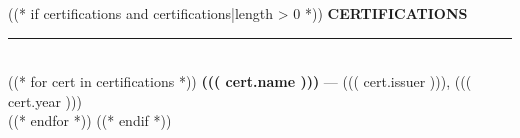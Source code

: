 \documentclass[11pt,a4paper]{article}
\begin{document}
\begin{minipage}[t]{0.60\textwidth}
\begin{minipage}[t]{0.88\textwidth}
((* if certifications and certifications|length > 0 *))
{\fontsize{11}{13}\selectfont\bfseries\color{navy}\MakeUppercase{Certifications}}\\[2pt]
{\color{gold}\rule{\linewidth}{0.4pt}}\\[6pt]
((* for cert in certifications *))
{\bfseries ((( cert.name )))} --- {\small\color{muted} ((( cert.issuer ))), ((( cert.year )))}\\[6pt]
((* endfor *))
((* endif *))

\end{minipage}
\end{minipage}
\end{document}

